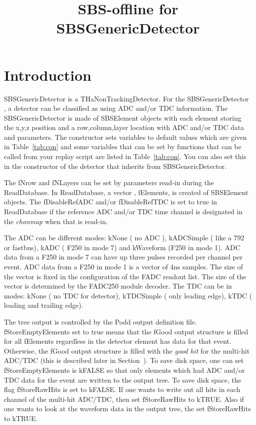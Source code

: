 \documentclass[11pt]{article}
\begin{document}
\title{SBS-offline for SBSGenericDetector}
\maketitle

\section{Introduction}

SBSGenericDetector is a THaNonTrackingDetector.
For the SBSGenericDetector , a detector can be classified as using ADC and/or TDC information.
The SBSGenericDetector is made of SBSElement objects  with each element storing 
the  x,y,z position and a row,column,layer location with ADC and/or TDC data and parameters.
The constructor sets variables to default values which are given in Table~\ref{tab:con} and some variables
that can be set by functions that can be called from your replay script are listed in Table~\ref{tab:con}. 
You can also set this in the constructor of the detector that inherits from SBSGenericDetector. 


The fNrow and fNLayers can be set by parameters read-in during the ReadDatabase. In ReadDatabase, a vector , fElements, is created of SBSElement objects.
The fDisableRefADC and/or fDisableRefTDC is set to true in ReadDatabase if the reference ADC and/or TDC time channel is designated in 
the {\it chanmap} when that is read-in.

The ADC can be different modes: kNone ( no ADC ), kADCSimple ( like a 792 or fastbus), kADC ( F250 in mode 7)
and kWaveform (F250 in mode 1). ADC data from a F250 in mode 7 can have up three pulses recorded
per channel per event. ADC data from a F250 in mode 1 is a vector of 4ns samples. The size of the vector is fixed in the configuration of the FADC readout list.  The size of the vector is determined by
the FADC250 module decoder. 
The TDC can be in modes: kNone ( no TDC for detector), kTDCSimple ( only leading edge), kTDC ( leading and trailing edge). 




The tree output is controlled by the Podd output definition file. fStoreEmptyElements set to true means that the fGood output structure is filled for all
fElements regardless in the detector element has data for that event. Otherwise, the fGood output structure is filled with the {\it good hit} 
for the multi-hit ADC/TDC (this is described later in Section~).
To save disk space, one can set fStoreEmptyElements is kFALSE so
that  only elements which had ADC and/or TDC data for the event are written to the output tree.
To save disk space, the flag fStoreRawHits is set to kFALSE. If one wants to write out all hits in each channel of the multi-hit ADC/TDC, then
set  fStoreRawHits to kTRUE. {\color{red} Also if one wants to look at the waveform data in the output tree, the set  fStoreRawHits to kTRUE.}
\end{document}
